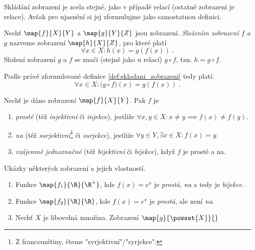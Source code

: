 Skládání zobrazení je zcela stejné, jako v případě relací (ostatně zobrazení je relace). Avšak pro ujasnění si jej zformulujme jako samostatnou definici.
\begin{definition}\label{def:skladani_zobrazeni}
    Nechť $\map{f}{X}{Y}$ a $\map{g}{Y}{Z}$ jsou zobrazení. \emph{Složením zobrazení $f$ a $g$} nazveme zobrazení $\map{h}{X}{Z}$, pro které platí
    \begin{equation*}
        \forall x\in X: h(x)=g(f(x))\; .
    \end{equation*}
    Složení zobrazení $g$ a $f$ se značí (stejně jako u relací) $g\circ f$, tzn. $h=g \circ f$.
\end{definition}
Podle právě zformulované definice \ref{def:skladani_zobrazeni} tedy platí:
\begin{equation*}
    \forall x\in X: \big(g\circ f\big)(x)=g(f(x))\; .
\end{equation*}
\begin{definition}\label{def:vlastnosti_zobrazeni}
    Nechť je dáno zobrazení $\map{f}{X}{Y}$. Pak $f$ je
    \begin{enumerate}[label=(\roman*)]
        \item \emph{prosté} (též \emph{injektivní} či \emph{injekce}), jestliže $\forall x,y\in X: x\neq y \implies f(x)\neq f(y)$.
        \item \emph{na} (též \emph{surjektivní}\footnote{Z francouzštiny, čteme "syrjektivní"/"syrjekce".} či \emph{surjekce}), jestliže $\forall y\in Y, \exists x\in X: f(x)=y$.
        \item \emph{vzájemně jednoznačné} (též \emph{bijektivní} či \emph{bijekce}), když $f$ je prosté a na.
    \end{enumerate}
\end{definition}
\begin{example}
    Ukázky některých zobrazení a jejich vlastností.
    \begin{enumerate}[label=(\roman*)]
        \item Funkce $\map{f_1}{\R}{\R^+}$, kde $f(x)=e^x$ je \emph{prostá}, \emph{na} a tedy je \emph{bijekce}.
        \item Funkce $\map{f_2}{\R}{\R}$, kde $f(x)=e^x$ je \emph{prostá}, ale není \emph{na}.
        \item Nechť $X$ je libovolná množina. Zobrazení $\map{g}{\powset{X}}{}$
    \end{enumerate}
\end{example}